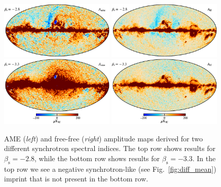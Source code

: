 \documentclass[twocolumn]{aa}
\begin{document}
\begin{figure}
  \center	
  \includegraphics[width=0.49\textwidth]{figs/ame_amp_sbeta280_w12_60arcmin_c-planck.pdf}
  \includegraphics[width=0.49\textwidth]{figs/ff_amp_sbeta280_w12_30arcmin_c-planck.pdf}\\
  \includegraphics[width=0.49\textwidth]{figs/ame_amp_sbeta330_w12_60arcmin_cb_c-planck.pdf}
  \includegraphics[width=0.49\textwidth]{figs/ff_amp_sbeta330_w12_30arcmin_cb_c-planck.pdf}
  \caption{AME (\emph{left}) and free-free (\emph{right}) amplitude
    maps derived for two different synchrotron spectral indices. The
    top row shows results for $\beta_{\mathrm{s}}=-2.8$, while
    the bottom row shows results for $\beta_{\mathrm{s}}=-3.3$.
    In the top row we see a negative synchrotron-like
    (see Fig.~\ref{fig:diff_mean}) imprint that is not present in
    the bottom row.
  }
  \label{fig:AME_vs_synch_beta}
\end{figure}
\end{document}
